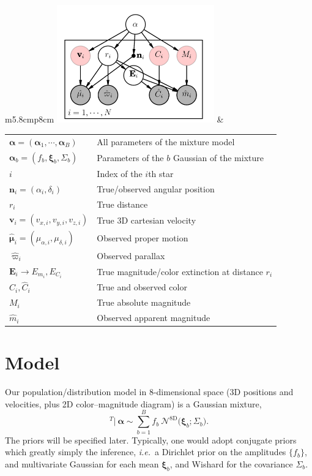\documentclass{article}
\newcommand{\ie}{{\textit{i.e.}~}}
\newcommand{\equ}[1]{\begin{equation}#1\end{equation}}
\renewcommand{\vec}[1]{\boldsymbol{#1}}
\begin{document}
\begin{tabular}{m{5.8cm}p{8cm}}
\hspace*{-0.8cm}\includegraphics[width=6.8cm]{pgm.png}
&
\begin{tabular}{ll}
	$\vec{\alpha} = (\vec{\alpha}_1, \cdots, \vec{\alpha}_B)$	&	All parameters of the mixture model\\
	$\vec{\alpha}_b = (f_b, \vec{\xi}_b, \Sigma_b)$ 	&	Parameters of the $b$ Gaussian of the mixture\\
	$i$	&	Index of the $i$th star	\\
	$\vec{n}_i = (\alpha_i, \delta_i)$ 	&	True/observed angular position	\\
	$r_i$		&	True distance	\\
	$\vec{v}_i = (v_{x,i}, v_{y,i}, v_{z,i})$	&	True 3D cartesian velocity		\\
	$\hat{\vec{\mu}}_i = (\mu_{\alpha,i}, \mu_{\delta,i})$	&	Observed proper motion \\
	$\hat{\varpi}_i$	&	Observed parallax	\\
	$\vec{E}_i \rightarrow E_{m_i}, E_{C_i}$	&	True magnitude/color extinction at distance $r_i$ 	\\
	$C_i, \hat{C}_i$	&	True and observed color	\\
	$M_i$	&	True absolute magnitude \\
	$\hat{m}_i$	&	Observed apparent magnitude \\
\end{tabular}
\end{tabular}

\section{Model}

Our population/distribution model in 8-dimensional space (3D positions and velocities, plus 2D color--magnitude diagram) is a Gaussian mixture,
\equ{
	[ \vec{v} \ \vec{n} \ r \ C \ M  ]^T \bigl\vert \ \vec{\alpha} \sim \sum_{b=1}^B f_b \ \mathcal{N}^\mathrm{8D}\bigl(  \vec{\xi}_b; \Sigma_b\bigr)  .
}	
The priors will be specified later. Typically, one would adopt conjugate priors which greatly simply the inference, \ie a Dirichlet prior on the amplitudes $\{ f_b\}$, and multivariate Gaussian for each mean $ \vec{\xi}_b$, and Wishard for the covariance $\Sigma_b$.
\end{document}
